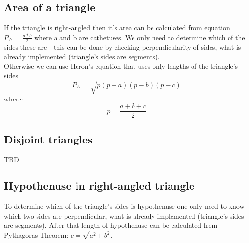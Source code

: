 \documentclass{article}
\begin{document}
\subsection{Area of a triangle}
If the triangle is right-angled then it's area can be calculated from equation $ P_\triangle = \frac{a*b}{2}$ where a and b are cathetuses. We only need to determine which of the sides these are - this can be done by checking perpendicularity of sides, what is already implemented (triangle's sides are segments).\\
Otherwise we can use Heron's equation that uses only lengths of the triangle's sides:
$$ P_\triangle = \sqrt{p(p-a)(p-b)(p-c)} $$
where:
$$ p = \frac{a+b+c}{2} $$
\subsection{Disjoint triangles}
TBD
\subsection{Hypothenuse in right-angled triangle}
To determine which of the triangle's sides is hypothenuse one only need to know which two sides are perpendicular, what is already implemented (triangle's sides are segments). After that length of hypothenuse can be calculated from Pythagoras Theorem: $ c = \sqrt{a^2+b^2} $.
\end{document}

